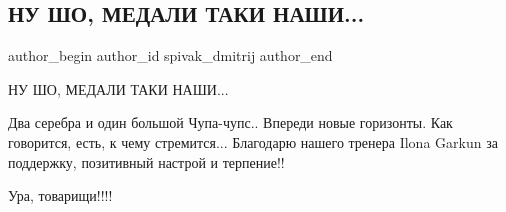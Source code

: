  
 
 
 
 
 
\subsection{НУ ШО, МЕДАЛИ ТАКИ НАШИ...}
\label{sec:13_06_2021.fb.spivak_dmitrij.1.medali_nashi}
\ifcmt
 author_begin
   author_id spivak_dmitrij
 author_end
\fi

НУ ШО, МЕДАЛИ ТАКИ НАШИ...

Два серебра и один большой Чупа-чупс..  Впереди новые горизонты. Как говорится,
есть, к чему стремится...  Благодарю нашего тренера Ilona Garkun за поддержку,
позитивный настрой и терпение!! 

Ура, товарищи!!!!


